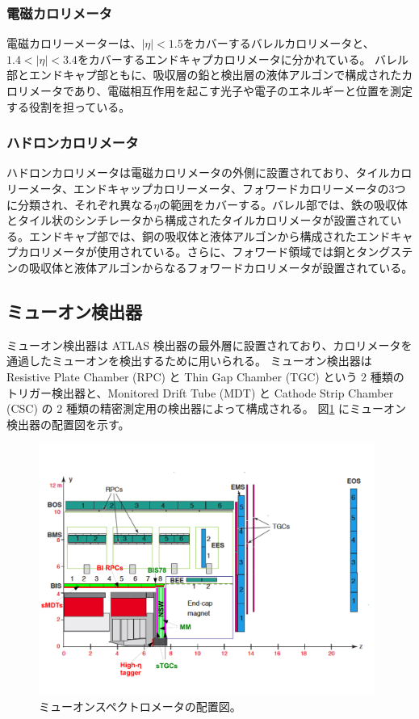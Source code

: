 \subsubsection{電磁カロリメータ}
電磁カロリーメーターは、$|\eta|<1.5$をカバーするバレルカロリメータと、$1.4<|\eta|<3.4$をカバーするエンドキャプカロリメータに分かれている。
バレル部とエンドキャプ部ともに、吸収層の鉛と検出層の液体アルゴンで構成されたカロリメータであり、電磁相互作用を起こす光子や電子のエネルギーと位置を測定する役割を担っている。

\subsubsection{ハドロンカロリメータ}
ハドロンカロリメータは電磁カロリメータの外側に設置されており、タイルカロリーメータ、エンドキャップカロリーメータ、フォワードカロリーメータの3つに分類され、それぞれ異なる$\eta$の範囲をカバーする。バレル部では、鉄の吸収体とタイル状のシンチレータから構成されたタイルカロリメータが設置されている。エンドキャプ部では、銅の吸収体と液体アルゴンから構成されたエンドキャプカロリメータが使用されている。さらに、フォワード領域では銅とタングステンの吸収体と液体アルゴンからなるフォワードカロリメータが設置されている。

\subsection{ミューオン検出器}\label{section2-2-4}
ミューオン検出器は ATLAS 検出器の最外層に設置されており、カロリメータを通過したミューオンを検出するために用いられる。
ミューオン検出器は Resistive Plate Chamber (RPC) と Thin Gap Chamber (TGC) という 2 種類のトリガー検出器と、Monitored Drift Tube (MDT) と Cathode Strip Chamber (CSC) の 2 種類の精密測定用の検出器によって構成される。
図\ref{fig:ミューオン} にミューオン検出器の配置図を示す。

\begin{figure}[tb]
  \centering
  \includegraphics[clip, width=11cm]{fig/2/ch01_fig_03a.pdf}
  \caption{ミューオンスペクトロメータの配置図。}
  \label{fig:ミューオン}
\end{figure}

